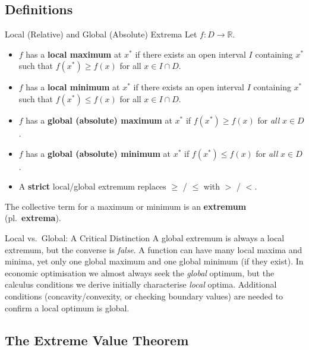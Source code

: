 \documentclass[12pt, a4paper]{article}
\theoremstyle{definition}
\newcommand{\R}{\mathbb{R}}
\begin{document}
\subsection{Definitions}

\begin{defbox}{Local (Relative) and Global (Absolute) Extrema}
Let $f: D \to \R$.
\begin{itemize}
  \item $f$ has a \textbf{local maximum} at $x^*$ if there exists an open
        interval $I$ containing $x^*$ such that
        $f(x^*) \geq f(x)$ for all $x \in I \cap D$.

  \item $f$ has a \textbf{local minimum} at $x^*$ if there exists an open
        interval $I$ containing $x^*$ such that
        $f(x^*) \leq f(x)$ for all $x \in I \cap D$.

  \item $f$ has a \textbf{global (absolute) maximum} at $x^*$ if
        $f(x^*) \geq f(x)$ for \emph{all} $x \in D$.

  \item $f$ has a \textbf{global (absolute) minimum} at $x^*$ if
        $f(x^*) \leq f(x)$ for \emph{all} $x \in D$.

  \item A \textbf{strict} local/global extremum replaces $\geq$ / $\leq$
        with $>$ / $<$.
\end{itemize}
The collective term for a maximum or minimum is an \textbf{extremum}
(pl.\ \textbf{extrema}).
\end{defbox}

\begin{warnbox}{Local vs.\ Global: A Critical Distinction}
A global extremum is always a local extremum, but the converse is
\emph{false}.  A function can have many local maxima and minima, yet only one
global maximum and one global minimum (if they exist).  In economic
optimisation we almost always seek the \emph{global} optimum, but the
calculus conditions we derive initially characterise \emph{local} optima.
Additional conditions (concavity/convexity, or checking boundary values) are
needed to confirm a local optimum is global.
\end{warnbox}

\subsection{The Extreme Value Theorem}
\end{document}
